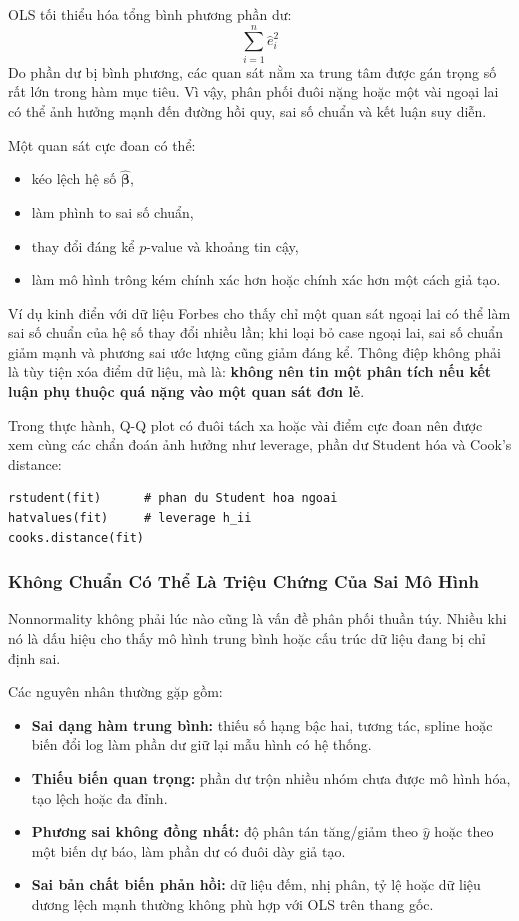 OLS tối thiểu hóa tổng bình phương phần dư:
\[
  \sum_{i=1}^{n} \hat e_i^2
\]
Do phần dư bị bình phương, các quan sát nằm xa trung tâm được gán trọng số rất lớn trong hàm mục tiêu. Vì vậy, phân phối đuôi nặng hoặc một vài ngoại lai có thể ảnh hưởng mạnh đến đường hồi quy, sai số chuẩn và kết luận suy diễn.

Một quan sát cực đoan có thể:
\begin{itemize}
  \item kéo lệch hệ số $\hat{\boldsymbol{\beta}}$,
  \item làm phình to sai số chuẩn,
  \item thay đổi đáng kể $p$-value và khoảng tin cậy,
  \item làm mô hình trông kém chính xác hơn hoặc chính xác hơn một cách giả tạo.
\end{itemize}

Ví dụ kinh điển với dữ liệu Forbes cho thấy chỉ một quan sát ngoại lai có thể làm sai số chuẩn của hệ số thay đổi nhiều lần; khi loại bỏ case ngoại lai, sai số chuẩn giảm mạnh và phương sai ước lượng cũng giảm đáng kể. Thông điệp không phải là tùy tiện xóa điểm dữ liệu, mà là: \textbf{không nên tin một phân tích nếu kết luận phụ thuộc quá nặng vào một quan sát đơn lẻ}.

Trong thực hành, Q-Q plot có đuôi tách xa hoặc vài điểm cực đoan nên được xem cùng các chẩn đoán ảnh hưởng như leverage, phần dư Student hóa và Cook's distance:
\begin{lstlisting}[style=Rstyle]
rstudent(fit)      # phan du Student hoa ngoai
hatvalues(fit)     # leverage h_ii
cooks.distance(fit)
\end{lstlisting}

\subsubsection{Không Chuẩn Có Thể Là Triệu Chứng Của Sai Mô Hình}

Nonnormality không phải lúc nào cũng là vấn đề phân phối thuần túy. Nhiều khi nó là dấu hiệu cho thấy mô hình trung bình hoặc cấu trúc dữ liệu đang bị chỉ định sai.

Các nguyên nhân thường gặp gồm:
\begin{itemize}
  \item \textbf{Sai dạng hàm trung bình:} thiếu số hạng bậc hai, tương tác, spline hoặc biến đổi log làm phần dư giữ lại mẫu hình có hệ thống.
  \item \textbf{Thiếu biến quan trọng:} phần dư trộn nhiều nhóm chưa được mô hình hóa, tạo lệch hoặc đa đỉnh.
  \item \textbf{Phương sai không đồng nhất:} độ phân tán tăng/giảm theo $\hat y$ hoặc theo một biến dự báo, làm phần dư có đuôi dày giả tạo.
  \item \textbf{Sai bản chất biến phản hồi:} dữ liệu đếm, nhị phân, tỷ lệ hoặc dữ liệu dương lệch mạnh thường không phù hợp với OLS trên thang gốc.
\end{itemize}

